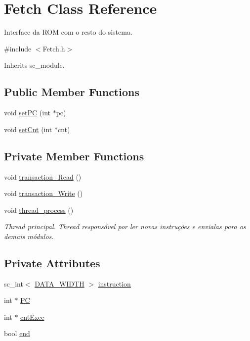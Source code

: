 \hypertarget{classFetch}{\section{Fetch Class Reference}
\label{classFetch}
}


Interface da R\+O\+M com o resto do sistema.  




{\ttfamily \#include $<$Fetch.\+h$>$}



Inherits sc\+\_\+module.

\subsection*{Public Member Functions}
\begin{DoxyCompactItemize}
\item 
void \hyperlink{classFetch_af5532f59af4faa4b22abe5c818e54775}{set\+P\+C} (int $\ast$pc)
\item 
void \hyperlink{classFetch_aabf17d2c69db4926534637e6d45a75f5}{set\+Cnt} (int $\ast$cnt)
\end{DoxyCompactItemize}
\subsection*{Private Member Functions}
\begin{DoxyCompactItemize}
\item 
void \hyperlink{classFetch_a2201a1cd5048111b9f7bc7266964e0fb}{transaction\+\_\+\+Read} ()
\item 
void \hyperlink{classFetch_a4f2066d5330459037444ecb2a063f1da}{transaction\+\_\+\+Write} ()
\item 
void \hyperlink{classFetch_a5df8ae654e8d6a679a31f69bee65c7f0}{thread\+\_\+process} ()
\begin{DoxyCompactList}\small\item\em Thread principal. Thread responsável por ler novas instruções e envialas para os demais módulos. \end{DoxyCompactList}\end{DoxyCompactItemize}
\subsection*{Private Attributes}
\begin{DoxyCompactItemize}
\item 
sc\+\_\+int$<$ \hyperlink{Defines_8h_af087b76f9707be9d3b43ba0c782c31c3}{D\+A\+T\+A\+\_\+\+W\+I\+D\+T\+H} $>$ \hyperlink{classFetch_ab7c97d2c0dab91563c0f33ba6c6a4cb0}{instruction}
\item 
int $\ast$ \hyperlink{classFetch_a843f7a6498d7c4049751f8e7267f6609}{P\+C}
\item 
int $\ast$ \hyperlink{classFetch_a9598888b1bb54bf4946efe56639279d8}{cnt\+Exec}
\item 
bool \hyperlink{classFetch_ae42d76542792425cdd2b896b4558cb8b}{end}
\end{DoxyCompactItemize}


